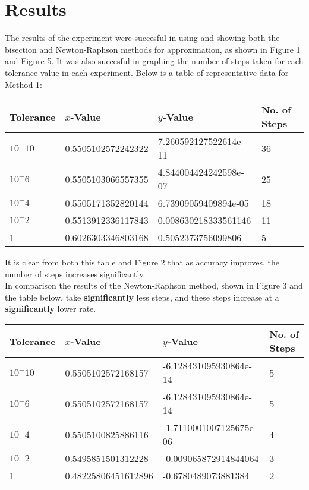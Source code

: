 \documentclass{article}
\begin{document}
\section{Results}
The results of the experiment were succesful in using and showing both the bisection and Newton-Raphson methods for approximation, as shown in Figure 1 and Figure 5. It was also succesful in graphing the number of steps taken for each tolerance value in each experiment. Below is a table  of representative data for Method 1:\\
\begin{table}[H]
\begin{tabular}{|l|l|l|l|}
	\hline
	Tolerance & $x$-Value & $y$-Value & No. of Steps \\ \hline
	$10^-10$ & 0.5505102572242322 & 7.260592127522614e-11 & 36 \\ \hline
	$10^-6$ & 0.5505103066557355 & 4.844004424242598e-07 & 25 \\ \hline
	$10^-4$ & 0.5505171352820144 & 6.73909059409894e-05 & 18 \\ \hline
	$10^-2$ & 0.5513912336117843 & 0.008630218333561146 & 11 \\ \hline
	1 & 0.6026303346803168 & 0.5052373756099806 & 5 \\
	\hline
\end{tabular}
\end{table}
It is clear from both this table and Figure 2 that as accuracy improves, the number of steps increases significantly.\\
\indent In comparison the results of the Newton-Raphson method, shown in Figure 3 and the table below, take \textbf{significantly} less steps, and these steps increase at a \textbf{significantly} lower rate.\\
\begin{table}[H]
	\begin{tabular}{|l|l|l|l|}
	\hline
	Tolerance & $x$-Value & $y$-Value & No. of Steps \\ \hline
	$10^-10$ & 0.5505102572168157 & -6.128431095930864e-14 & 5 \\ \hline
	$10^-6$ & 0.5505102572168157 & -6.128431095930864e-14 & 5 \\ \hline
	$10^-4$ & 0.5505100825886116 & -1.7110001007125675e-06 & 4 \\ \hline
	$10^-2$ & 0.5495851501312228 & -0.009065872914844064 & 3 \\ \hline
	1 & 0.48225806451612896 & -0.6780489073881384 & 2 \\
	\hline
	\end{tabular}
\end{table}
\end{document}
